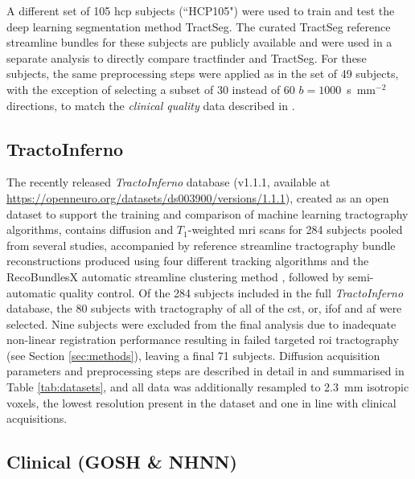 A different set of 105 \gls{hcp} subjects (``HCP105") were used to train and test the deep learning segmentation method TractSeg\autocite{Wasserthal2018}.
The curated TractSeg reference streamline bundles for these subjects are publicly available\autocite{Wasserthal2018b} and were used in a separate analysis to directly compare tractfinder and TractSeg.
For these subjects, the same preprocessing steps were applied as in the set of 49 subjects, with the exception of selecting a subset of 30 instead of 60 $b=1000$~s~mm$^{-2}$ directions, to match the \textit{clinical quality} data described in \textcite{Wasserthal2018}.

\subsection{TractoInferno}

The recently released \textit{TractoInferno} database (v1.1.1, available at \url{https://openneuro.org/datasets/ds003900/versions/1.1.1})\autocite{Poulin2022a,Poulin2022}, created as an open dataset to support the training and comparison of machine learning tractography algorithms, contains diffusion and $T_1$-weighted \gls{mri} scans for 284 subjects pooled from several studies, accompanied by reference streamline tractography bundle reconstructions produced using four different tracking algorithms and the RecoBundlesX automatic streamline clustering method \autocite{Garyfallidis2018,Rheault2020a}, followed by semi-automatic quality control.
Of the 284 subjects included in the full \textit{TractoInferno} database, the 80 subjects with tractography of all of the \gls{cst}, \gls{or}, \gls{ifof} and \gls{af} were selected.
Nine subjects were excluded from the final analysis due to inadequate non-linear registration performance resulting in failed targeted \gls{roi} tractography (see Section \ref{sec:methods}), leaving a final 71 subjects.
Diffusion acquisition parameters and preprocessing steps are described in detail in \textcite{Poulin2022} and summarised in Table \ref{tab:datasets}, and all data was additionally resampled to 2.3~mm isotropic voxels, the lowest resolution present in the dataset and one in line with clinical acquisitions.

\subsection{Clinical (GOSH \& NHNN)}

